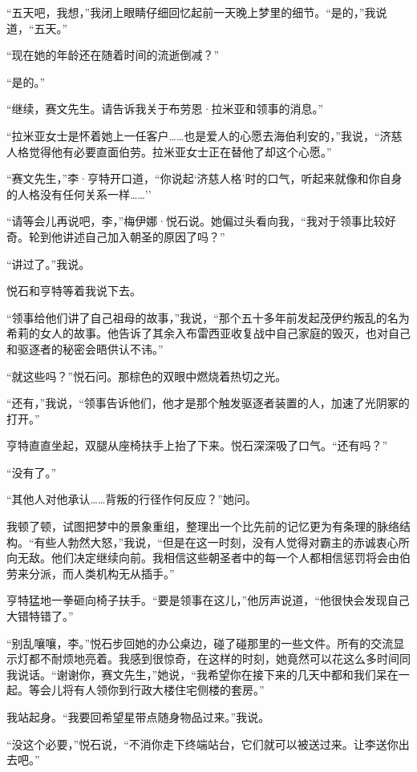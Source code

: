 \documentclass[AutoFakeBold=true]{book}
\begin{document}
``五天吧，我想，''我闭上眼睛仔细回忆起前一天晚上梦里的细节。``是的，''我说道，``五天。''

``现在她的年龄还在随着时间的流逝倒减？''

``是的。''

``继续，赛文先生。请告诉我关于布劳恩·拉米亚和领事的消息。''

``拉米亚女士是怀着她上一任客户……也是爱人的心愿去海伯利安的，''我说，``济慈人格觉得他有必要直面伯劳。拉米亚女士正在替他了却这个心愿。''

``赛文先生，''李·亨特开口道，``你说起`济慈人格'时的口气，听起来就像和你自身的人格没有任何关系一样……''

``请等会儿再说吧，李，''梅伊娜·悦石说。她偏过头看向我，``我对于领事比较好奇。轮到他讲述自己加入朝圣的原因了吗？''

``讲过了。''我说。

悦石和亨特等着我说下去。

``领事给他们讲了自己祖母的故事，''我说，``那个五十多年前发起茂伊约叛乱的名为希莉的女人的故事。他告诉了其余入布雷西亚收复战中自己家庭的毁灭，也对自己和驱逐者的秘密会晤供认不讳。''

``就这些吗？''悦石问。那棕色的双眼中燃烧着热切之光。

``还有，''我说，``领事告诉他们，他才是那个触发驱逐者装置的人，加速了光阴冢的打开。''

亨特直直坐起，双腿从座椅扶手上抬了下来。悦石深深吸了口气。``还有吗？''

``没有了。''

``其他人对他承认……背叛的行径作何反应？''她问。

我顿了顿，试图把梦中的景象重组，整理出一个比先前的记忆更为有条理的脉络结构。``有些人勃然大怒，''我说，``但是在这一时刻，没有人觉得对霸主的赤诚衷心所向无敌。他们决定继续向前。我相信这些朝圣者中的每一个人都相信惩罚将会由伯劳来分派，而人类机构无从插手。''

亨特猛地一拳砸向椅子扶手。``要是领事在这儿，''他厉声说道，``他很快会发现自己大错特错了。''

``别乱嚷嚷，李。''悦石步回她的办公桌边，碰了碰那里的一些文件。所有的交流显示灯都不耐烦地亮着。我感到很惊奇，在这样的时刻，她竟然可以花这么多时间同我说话。``谢谢你，赛文先生，''她说，``我希望你在接下来的几天中都和我们呆在一起。等会儿将有人领你到行政大楼住宅侧楼的套房。''

我站起身。``我要回希望星带点随身物品过来。''我说。

``没这个必要，''悦石说，``不消你走下终端站台，它们就可以被送过来。让李送你出去吧。''
\end{document}
